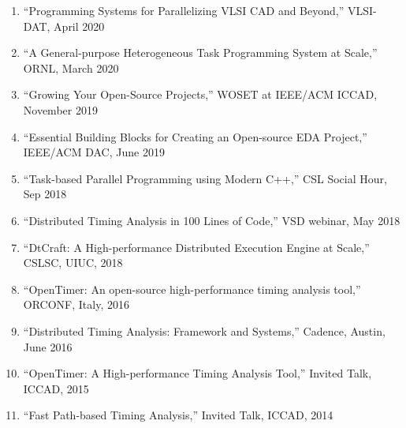 \documentclass[A4,11pt]{article}
\begin{document}
\begin{enumerate}
  \item ``Programming Systems for Parallelizing VLSI CAD and Beyond,'' VLSI-DAT, April 2020
  \item ``A General-purpose Heterogeneous Task Programming System at Scale,'' ORNL, March 2020
  \item ``Growing Your Open-Source Projects,'' WOSET at IEEE/ACM ICCAD, November 2019
  \item ``Essential Building Blocks for Creating an Open-source EDA Project,'' IEEE/ACM DAC, June 2019
  \item ``Task-based Parallel Programming using Modern C++,'' CSL Social Hour, Sep 2018
  \item ``Distributed Timing Analysis in 100 Lines of Code,'' VSD webinar, May 2018
  \item ``DtCraft: A High-performance Distributed Execution Engine at Scale,'' CSLSC, UIUC, 2018
  \item ``OpenTimer: An open-source high-performance timing analysis tool,'' ORCONF, Italy, 2016
  \item ``Distributed Timing Analysis: Framework and Systems,'' Cadence, Austin, June 2016
  \item ``OpenTimer: A High-performance Timing Analysis Tool,'' Invited Talk, ICCAD, 2015
  \item ``Fast Path-based Timing Analysis,'' Invited Talk, ICCAD, 2014

 \end{enumerate}

\end{document}
